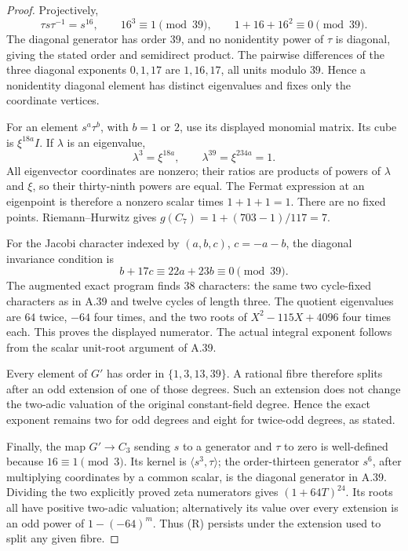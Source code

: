 \documentclass[11pt]{article}
\begin{document}
\begin{proof}
Projectively,
\[
       \tau s\tau^{-1}=s^{16},\qquad
       16^3\equiv1\pmod{39},\qquad
       1+16+16^2\equiv0\pmod{39}.
\]
The diagonal generator has order \(39\), and no nonidentity
power of \(\tau\) is diagonal, giving the stated order
and semidirect product. The pairwise differences of the
three diagonal exponents \(0,1,17\) are \(1,16,17\),
all units modulo \(39\). Hence a nonidentity diagonal
element has distinct eigenvalues and fixes only the
coordinate vertices.

For an element \(s^a\tau^b\), with \(b=1\) or \(2\),
use its displayed monomial matrix. Its cube is
\(\xi^{18a}I\). If \(\lambda\) is an eigenvalue,
\[
              \lambda^3=\xi^{18a},\qquad
              \lambda^{39}=\xi^{234a}=1.
\]
All eigenvector coordinates are nonzero; their ratios
are products of powers of \(\lambda\) and \(\xi\),
so their thirty-ninth powers are equal. The Fermat
expression at an eigenpoint is therefore a nonzero
scalar times \(1+1+1=1\). There are no fixed points.
Riemann--Hurwitz gives
\(g(C_7)=1+(703-1)/117=7\).

For the Jacobi character indexed by \((a,b,c)\),
\(c=-a-b\), the diagonal invariance condition is
\[
                   b+17c\equiv22a+23b\equiv0\pmod{39}.
\]
The augmented exact program finds \(38\) characters:
the same two cycle-fixed characters as in A.39 and
twelve cycles of length three. The quotient eigenvalues
are \(64\) twice, \(-64\) four times, and the two
roots of \(X^2-115X+4096\) four times each.
This proves the displayed numerator. The actual
integral exponent follows from the scalar unit-root
argument of A.39.

Every element of \(G'\) has order in
\(\{1,3,13,39\}\). A rational fibre therefore splits
after an odd extension of one of those degrees.
Such an extension does not change the two-adic valuation
of the original constant-field degree. Hence the exact
exponent remains two for odd degrees and eight for
twice-odd degrees, as stated.

Finally, the map \(G'\to C_3\) sending \(s\) to a
generator and \(\tau\) to zero is well-defined because
\(16\equiv1\pmod3\). Its kernel is
\(\langle s^3,\tau\rangle\); the order-thirteen
generator \(s^6\), after multiplying coordinates by
a common scalar, is the diagonal generator in A.39.
Dividing the two explicitly proved zeta numerators gives
\((1+64T)^{24}\). Its roots all have positive two-adic
valuation; alternatively its value over every extension
is an odd power of \(1-(-64)^m\). Thus (R) persists
under the extension used to split any given fibre.
\end{proof}
\end{document}
